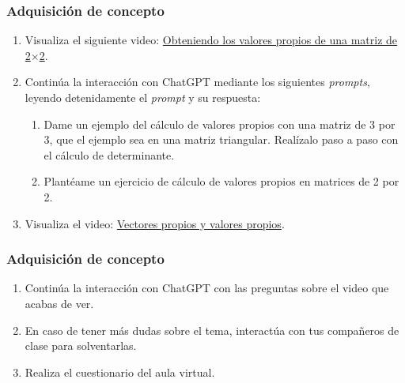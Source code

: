 \begin{frame}
    \frametitle{Adquisición de concepto}
\small
\begin{enumerate}[leftmargin=*,label=\arabic*.,start=2]
    \item Visualiza el siguiente video: \href{https://youtu.be/HET8XcIX-n4?si=t4lUbTmWaPOTbtAM}{Obteniendo los valores propios de una matriz de 2$\times$2}.
    \item Continúa la interacción con ChatGPT mediante los siguientes \textit{prompts}, leyendo detenidamente el \textit{prompt} y su respuesta:
    \begin{enumerate}[label=\textit{Prompt \arabic*.},leftmargin=2.1cm,start=4]
        \item Dame un ejemplo del cálculo de valores propios con una matriz de 3 por 3, que el ejemplo sea en una matriz triangular. Realízalo paso a paso con el cálculo de determinante.
        \item Plantéame un ejercicio de cálculo de valores propios en matrices de 2 por 2.
    \end{enumerate}
    \item Visualiza el video: \href{https://youtu.be/Gx0PaWI9eYo?si=oTPRSIfeEopspelW}{Vectores propios y valores propios}.
\end{enumerate}
\end{frame}

\begin{frame}
    \frametitle{Adquisición de concepto}
\small
\begin{enumerate}[leftmargin=*, label=\arabic*., start=4]
    \item Continúa la interacción con ChatGPT con las preguntas sobre el video que acabas de ver.
     \item En caso de tener más dudas sobre el tema, interactúa con tus compañeros de clase para solventarlas.
    \item Realiza el cuestionario del aula virtual.
\end{enumerate}
\end{frame}

